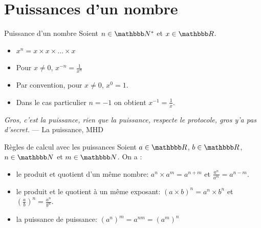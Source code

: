 \documentclass[10pt,a4paper,openany,twoside,prof]{book}
\begin{document}
\begin{prop}{}{}
\begin{itemize}

		\end{itemize}
\end{prop}


\section{Puissances d'un nombre}

\begin{defi}{Puissance d'un nombre}{}
  Soient $n\in\N^*$ et $x\in\R$.

  \begin{itemize}
	\item
	$x^n= x\times x \times \dots\times x$
	\item Pour $x\ne0$, $x^{-n}=\frac{1}{x^n}$
  \end{itemize}
\end{defi}

\begin{rems}{}{}
	\begin{itemize}
		\item
		Par convention, pour $x\ne0$, $x^0=1$.
		\item
		Dans le cas particulier $n=-1$ on obtient $x^{-1}=\frac{1}{x}$.
	\end{itemize}
\end{rems}

\textit{\og Gros, c'est la puissance, rien que la puissance, respecte le protocole, gros y'a pas d'secret.\fg{}} --- La puissance, MHD

\begin{prop}{Règles de calcul avec les puissances}{}
	Soient $a\in\R$, $b\in\R$, $n\in\N$ et $m\in\N$. On a :
	\begin{itemize}
		\item le produit et quotient d'un même nombre: $a^n\times a^m = a^{n+m}$ et $\frac{a^n}{a^m} = a^{n-m}$.
		\item le produit et le quotient à un même exposant: $(a\times b)^n = a^n \times b^n$ et $(\frac{a}{b})^n=\frac{a^n}{b^n}$.
		\item la puissance de puissance: $(a^n)^m = a^{nm} = (a^m)^n$
	\end{itemize}
\end{prop}
\end{document}
